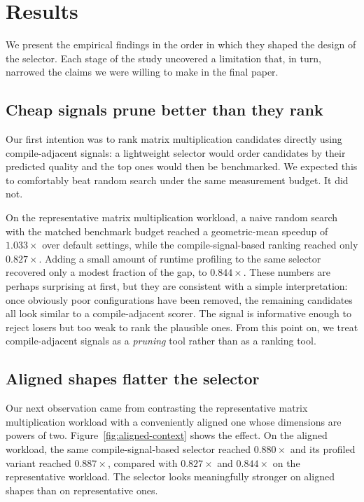 \section{Results}
\label{sec:results}

We present the empirical findings in the order in which they shaped the design of the selector. Each stage of the study uncovered a limitation that, in turn, narrowed the claims we were willing to make in the final paper.

\subsection{Cheap signals prune better than they rank}

Our first intention was to rank matrix multiplication candidates directly using compile-adjacent signals: a lightweight selector would order candidates by their predicted quality and the top ones would then be benchmarked. We expected this to comfortably beat random search under the same measurement budget. It did not.

On the representative matrix multiplication workload, a naive random search with the matched benchmark budget reached a geometric-mean speedup of $1.033\times$ over default settings, while the compile-signal-based ranking reached only $0.827\times$. Adding a small amount of runtime profiling to the same selector recovered only a modest fraction of the gap, to $0.844\times$. These numbers are perhaps surprising at first, but they are consistent with a simple interpretation: once obviously poor configurations have been removed, the remaining candidates all look similar to a compile-adjacent scorer. The signal is informative enough to reject losers but too weak to rank the plausible ones. From this point on, we treat compile-adjacent signals as a \emph{pruning} tool rather than as a ranking tool.

\subsection{Aligned shapes flatter the selector}

Our next observation came from contrasting the representative matrix multiplication workload with a conveniently aligned one whose dimensions are powers of two. Figure~\ref{fig:aligned-context} shows the effect. On the aligned workload, the same compile-signal-based selector reached $0.880\times$ and its profiled variant reached $0.887\times$, compared with $0.827\times$ and $0.844\times$ on the representative workload. The selector looks meaningfully stronger on aligned shapes than on representative ones.

